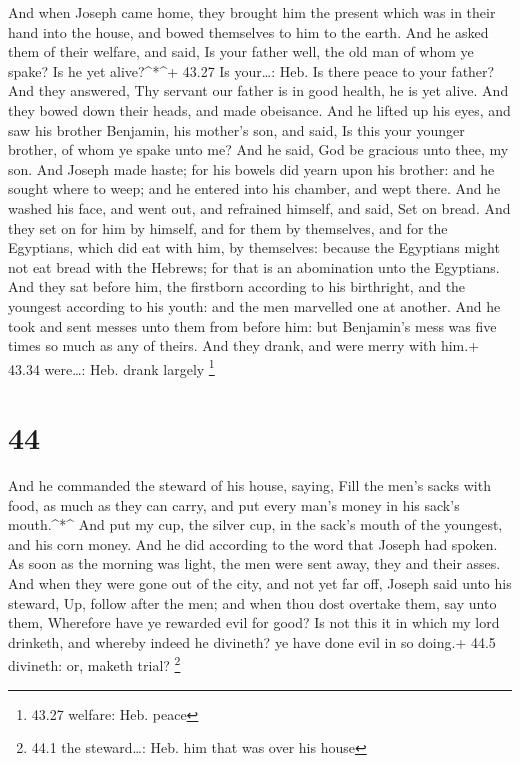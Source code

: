  And when Joseph came home, they brought him the present
which was in their hand into the house, and bowed themselves to him to
the earth.  And he asked them of their welfare, and said,
Is your father well, the old man of whom ye spake? Is he yet
alive?\^{}*\^{}+ 43.27 Is your\ldots: Heb. Is there peace to your
father?  And they answered, Thy servant our father is in
good health, he is yet alive. And they bowed down their heads, and made
obeisance.  And he lifted up his eyes, and saw his brother
Benjamin, his mother's son, and said, Is this your younger brother, of
whom ye spake unto me? And he said, God be gracious unto thee, my son.
 And Joseph made haste; for his bowels did yearn upon his
brother: and he sought where to weep; and he entered into his chamber,
and wept there.  And he washed his face, and went out, and
refrained himself, and said, Set on bread.  And they set on
for him by himself, and for them by themselves, and for the Egyptians,
which did eat with him, by themselves: because the Egyptians might not
eat bread with the Hebrews; for that is an abomination unto the
Egyptians.  And they sat before him, the firstborn
according to his birthright, and the youngest according to his youth:
and the men marvelled one at another.  And he took and sent
messes unto them from before him: but Benjamin's mess was five times so
much as any of theirs. And they drank, and were merry with him.+ 43.34
were\ldots: Heb. drank largely \footnote{43.27 welfare: Heb. peace}

\hypertarget{section-43}{%
\section{44}\label{section-43}}

 And he commanded the steward of his house, saying, Fill the
men's sacks with food, as much as they can carry, and put every man's
money in his sack's mouth.\^{}*\^{}  And put my cup, the
silver cup, in the sack's mouth of the youngest, and his corn money. And
he did according to the word that Joseph had spoken.  As
soon as the morning was light, the men were sent away, they and their
asses.  And when they were gone out of the city, and not yet
far off, Joseph said unto his steward, Up, follow after the men; and
when thou dost overtake them, say unto them, Wherefore have ye rewarded
evil for good?  Is not this it in which my lord drinketh,
and whereby indeed he divineth? ye have done evil in so doing.+ 44.5
divineth: or, maketh trial? \footnote{44.1 the steward\ldots: Heb. him
  that was over his house}

